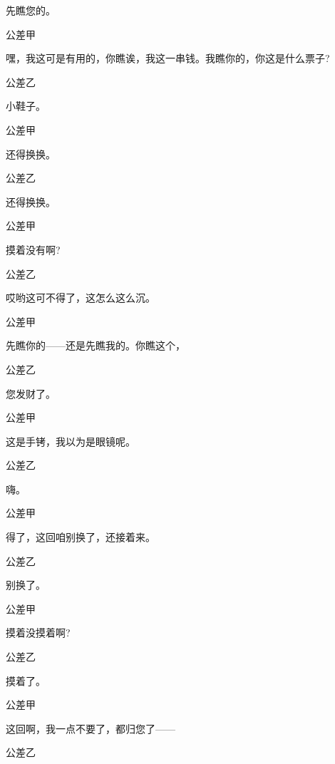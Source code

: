 先瞧您的。

公差甲\hspace{20pt}~

嘿，我这可是有用的，你瞧诶，我这一串钱。我瞧你的，你这是什么票子?

公差乙\hspace{20pt}~

小鞋子。

公差甲\hspace{20pt}~

还得换换。

公差乙\hspace{20pt}~

还得换换。

公差甲\hspace{20pt}~

摸着没有啊?

公差乙\hspace{20pt}~

哎哟这可不得了，这怎么这么沉。

公差甲\hspace{20pt}~

先瞧你的------还是先瞧我的。你瞧这个，

公差乙\hspace{20pt}~

您发财了。

公差甲\hspace{20pt}~

这是手铐，我以为是眼镜呢。

公差乙\hspace{20pt}~

嗨。

公差甲\hspace{20pt}~

得了，这回咱别换了，还接着来。

公差乙\hspace{20pt}~

别换了。

公差甲\hspace{20pt}~

摸着没摸着啊?

公差乙\hspace{20pt}~

摸着了。

公差甲\hspace{20pt}~

这回啊，我一点不要了，都归您了------

公差乙\hspace{20pt}~

